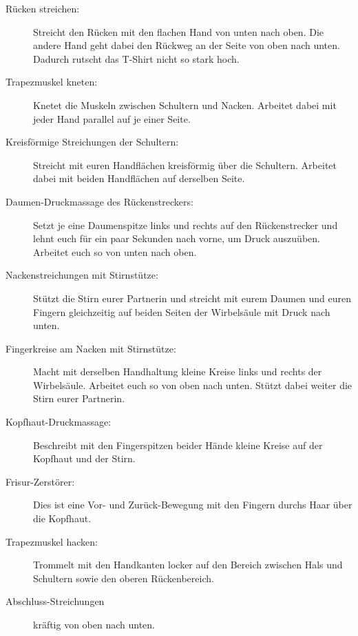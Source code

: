 \begin{description}
  \item [Rücken streichen:] Streicht den Rücken mit den flachen Hand von unten nach oben. Die andere Hand geht dabei den Rückweg an der Seite von oben nach unten. Dadurch rutscht das T-Shirt nicht so stark hoch.
  \item [Trapezmuskel kneten:] Knetet die Muskeln zwischen Schultern und Nacken. Arbeitet dabei mit jeder Hand parallel auf je einer Seite.
  \item [Kreisförmige Streichungen der Schultern:] Streicht mit euren Handflächen kreisförmig über die Schultern. Arbeitet dabei mit beiden Handflächen auf derselben Seite.
  \item [Daumen-Druckmassage des Rückenstreckers:] Setzt je eine Daumenspitze links und rechts auf den Rückenstrecker und lehnt euch für ein paar Sekunden nach vorne, um Druck auszuüben. Arbeitet euch so von unten nach oben.
  \item [Nackenstreichungen mit Stirnstütze:] Stützt die Stirn eurer Partnerin und streicht mit eurem Daumen und euren Fingern gleichzeitig auf beiden Seiten der Wirbelsäule mit Druck nach unten.
  \item [Fingerkreise am Nacken mit Stirnstütze:] Macht mit derselben Handhaltung kleine Kreise links und rechts der Wirbelsäule. Arbeitet euch so von oben nach unten. Stützt dabei weiter die Stirn eurer Partnerin.
  \item [Kopfhaut-Druckmassage:] Beschreibt mit den Fingerspitzen beider Hände kleine Kreise auf der Kopfhaut und der Stirn.
  \item [Frisur-Zerstörer:] Dies ist eine Vor- und Zurück-Bewegung mit den Fingern durchs Haar über die Kopfhaut.
  \item [Trapezmuskel hacken:] Trommelt mit den Handkanten locker auf den Bereich zwischen Hals und Schultern sowie den oberen Rückenbereich.
  \item [Abschluss-Streichungen] kräftig von oben nach unten.
\end{description}
